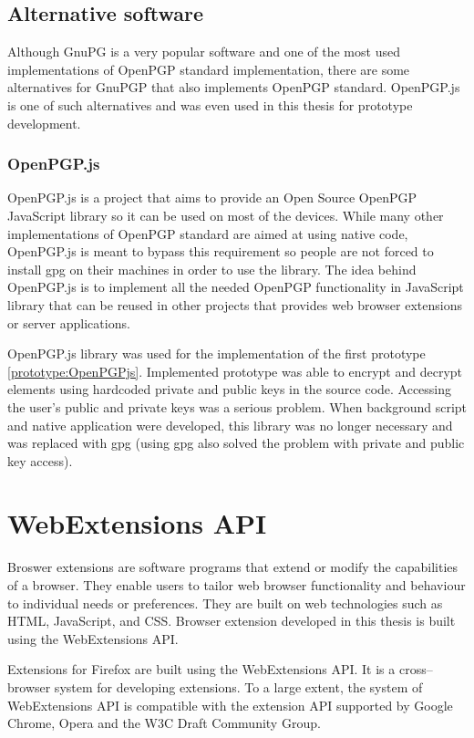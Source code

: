 \section{Alternative software}
Although GnuPG is a very popular software and one of the most used implementations of OpenPGP standard implementation, there are some alternatives for GnuPGP that also implements OpenPGP standard. OpenPGP.js is one of such alternatives and was even used in this thesis for prototype development.

\subsection*{OpenPGP.js}
OpenPGP.js is a project that aims to provide an Open Source OpenPGP JavaScript library so it can be used on most of the devices. While many other implementations of OpenPGP standard are aimed at using native code, OpenPGP.js is meant to bypass this requirement so people are not forced to install gpg on their machines in order to use the library. The idea behind OpenPGP.js is to implement all the needed OpenPGP functionality in JavaScript library that can be reused in other projects that provides web browser extensions or server applications. \cite{OpenPGPjs}

OpenPGP.js library was used for the implementation of the first prototype \ref{prototype:OpenPGPjs}. Implemented prototype was able to encrypt and decrypt elements using hardcoded private and public keys in the source code. Accessing the user's public and private keys was a serious problem.  When background script and native application were developed, this library was no longer necessary and was replaced with gpg (using gpg also solved the problem with private and public key access).

\chapter{WebExtensions API}
Broswer extensions are software programs that extend or modify the capabilities of a browser. They enable users to tailor web browser functionality and behaviour to individual needs or preferences. They are built on web technologies such as HTML, JavaScript, and CSS. Browser extension developed in this thesis is built using the WebExtensions API. \cite{chromeExtensions}

Extensions for Firefox are built using the WebExtensions API. It is a cross--browser system for developing extensions. To a large extent, the system of WebExtensions API is compatible with the extension API supported by Google Chrome, Opera and the W3C Draft Community Group. \cite{firefoxExtensions}

